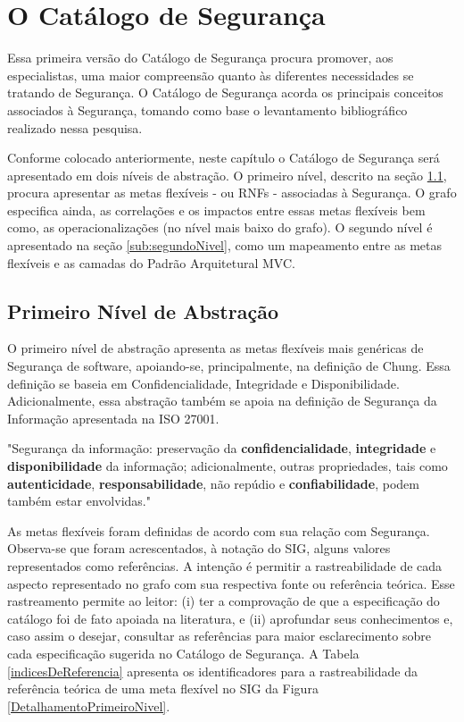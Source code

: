 \section{O Catálogo de Segurança}

Essa primeira versão do Catálogo de Segurança procura promover, aos especialistas, uma maior compreensão quanto às diferentes necessidades se tratando de Segurança. O Catálogo de Segurança acorda os principais conceitos associados à Segurança, tomando como base o levantamento bibliográfico realizado nessa pesquisa.

Conforme colocado anteriormente, neste capítulo o Catálogo de Segurança será apresentado em dois níveis de abstração. O primeiro nível, descrito na seção \ref{sub:primeiroNivel}, procura apresentar as metas flexíveis - ou RNFs - associadas à Segurança. O grafo especifica ainda, as correlações e os impactos entre essas metas flexíveis bem como, as operacionalizações (no nível mais baixo do grafo). O segundo nível é apresentado na seção \ref{sub:segundoNivel}, como um mapeamento entre as metas flexíveis e as camadas do Padrão Arquitetural MVC.

\subsection{Primeiro Nível de Abstração}
\label{sub:primeiroNivel}

O primeiro nível de abstração apresenta as metas flexíveis mais genéricas de Segurança de software, apoiando-se, principalmente, na definição de Chung. Essa definição se baseia em Confidencialidade, Integridade e Disponibilidade. Adicionalmente, essa abstração também se apoia na definição de Segurança da Informação apresentada na ISO 27001. 

\begin{citacao}
	"Segurança da informação: preservação da \textbf{confidencialidade}, \textbf{integridade} e \textbf{disponibilidade} da informação; adicionalmente, outras propriedades, tais como \textbf{autenticidade}, \textbf{responsabilidade}, não repúdio e \textbf{confiabilidade}, podem também estar envolvidas." \cite[p. 2]{documentation2005information}
\end{citacao}


As metas flexíveis foram definidas de acordo com sua relação com Segurança. Observa-se que foram acrescentados, à notação do SIG, alguns valores representados como referências. A intenção é permitir a rastreabilidade de cada aspecto representado no grafo com sua respectiva fonte ou referência teórica. Esse rastreamento permite ao leitor: (i) ter a comprovação de que a especificação do catálogo foi de fato apoiada na literatura, e (ii) aprofundar seus conhecimentos e, caso assim o desejar, consultar as referências para maior esclarecimento sobre cada especificação sugerida no Catálogo de Segurança. A Tabela \ref{indicesDeReferencia} apresenta os identificadores para a rastreabilidade da referência teórica de uma meta flexível no SIG da Figura \ref{DetalhamentoPrimeiroNivel}. 

